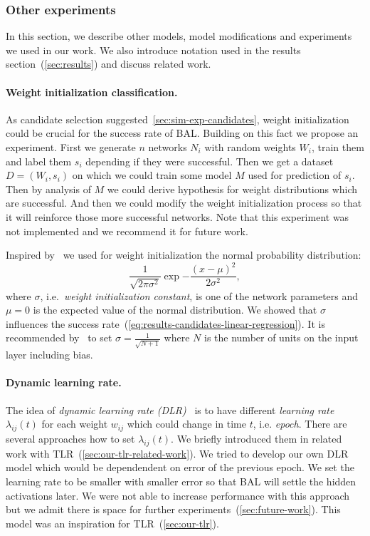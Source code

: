 \subsubsection{Other experiments}

In this section,  we describe other models, model modifications and experiments we used in our work. We also introduce notation used in the results section~(\ref{sec:results}) and discuss related work. 

\paragraph{Weight initialization classification.} 
\label{sec:our-weight-init-class}
As candidate selection suggested~\ref{sec:sim-exp-candidates}, weight initialization could be crucial for the success rate of BAL. Building on this fact we propose an experiment. First we generate $n$ networks $N_i$ with random weights $W_i$, train them and label them $s_i$ depending if they were successful. Then we get a dataset $D=(W_i, s_i)$ on which we could train some model $M$ used for prediction of $s_i$. Then by analysis of $M$ we could derive hypothesis for weight distributions which are successful. And then we could modify the weight initialization process so that it will reinforce those more successful networks. Note that this experiment was not implemented and we recommend it for future work. 

\label{sec:our-sigma} 

Inspired by~\citet{o1996bio} we used for weight initialization the normal probability distribution:
\begin{equation} 
  \frac{1}{\sqrt{2\pi \sigma^2}} \exp{-\frac{(x-\mu)^2}{2\sigma^2}},
  \label{eq:our-sigma} 
\end{equation} 
where $\sigma$, i.e.~\emph{weight initialization constant}, is one of the network parameters and $\mu = 0$ is the expected value of the normal distribution. We showed that $\sigma$ influences the success rate~(\ref{eq:results-candidates-linear-regression}). It is recommended by~\citet{o1996bio} to set $\sigma=\frac{1}{\sqrt{N + 1}}$ where $N$ is the number of units on the input layer including bias.

\paragraph{Dynamic learning rate.} 
\label{sec:our-dynamic-lambda} 
The idea of \emph{dynamic learning rate (DLR)}~\citep{jacobs1988increased} is to have different \emph{learning rate} $\lambda_{ij}(t)$ for each weight $w_{ij}$ which could change in time $t$, i.e. \emph{epoch}. There are several approaches how to set $\lambda_{ij}(t)$. We briefly introduced them in related work with TLR~(\ref{sec:our-tlr-related-work}). We tried to develop our own DLR model which would be dependendent on error of the previous epoch. We set the learning rate to be smaller with smaller error so that BAL will settle the hidden activations later. We were not able to increase performance with this approach but we admit there is space for further experiments~(\ref{sec:future-work}). This model was an inspiration for TLR~(\ref{sec:our-tlr}). 


